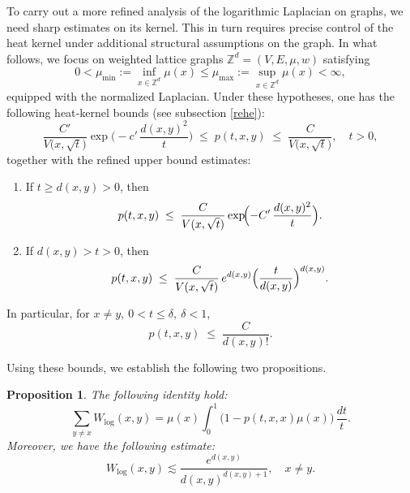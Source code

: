 \documentclass[reqno,12pt]{amsart}
\numberwithin{equation}{section}
\newtheorem{proposition}[theorem]{Proposition}
\begin{document}
To carry out a more refined analysis of the logarithmic Laplacian on graphs, we need sharp estimates on its kernel.  This in turn requires precise control of the heat kernel under additional structural assumptions on the graph.  In what follows, we focus on weighted lattice graphs \(\mathbb{Z}^d=(V,E,\mu,w)\) satisfying
\[
0<\mu_{\min}:=\inf_{x\in\mathbb{Z}^d}\mu(x)\le 
\mu_{\max}:=\sup_{x\in\mathbb{Z}^d}\mu(x)<\infty,
\]
equipped with the normalized Laplacian.  Under these hypotheses, one has the following heat‐kernel bounds (see subsection \ref{rehe}):
\begin{equation}\label{gaussian}
	\frac{C'}{V\bigl(x,\sqrt{t}\bigr)}
	\exp\!\biggl(-c'\,\frac{d(x,y)^2}{t}\biggr)
	\;\le\;
	p(t,x,y)
	\;\le\;
	\frac{C}{V\bigl(x,\sqrt{t}\bigr)},\quad  t>0,
\end{equation}
together with the refined upper bound estimates:
\begin{enumerate}
	\item If \(t \ge d(x,y)>0\), then
	\begin{equation}\label{222}
		p(t,x,y)\;\le\;\frac{C}{V(x,\sqrt{t})}\exp\!\Bigl(-C'\,\frac{d(x,y)^2}{t}\Bigr).
	\end{equation}
	\item If \(d(x,y)>t>0\), then
	\begin{equation}\label{444}
		p(t,x,y)\;\le\;\frac{C}{V(x,\sqrt{t})}\,e^{d(x,y)}\Bigl(\frac{t}{d(x,y)}\Bigr)^{d(x,y)}.
	\end{equation}
\end{enumerate}
In particular, for \(x\ne y,\:0 < t \le \delta,\:\delta<1\),
\begin{equation}\label{333}
	p(t,x,y)\;\le\;\frac{C}{d(x,y)!}.
\end{equation}

Using these bounds, we establish the following two propositions.

\begin{proposition}\label{prop:Wlog11}
	The following identity hold:
	\begin{equation}\label{wlog}
		\sum_{y\ne x}W_{\log}(x,y)
		=\mu(x)\int_0^1\bigl(1-p(t,x,x)\mu(x)\bigr)\,\frac{dt}{t}.
	\end{equation}
	Moreover, we have the following estimate:
	\begin{equation}\label{wlogg}
		W_{\log}(x,y)\lesssim \frac{e^{d(x,y)}}{d(x,y)^{d(x,y)+1}},\quad x\ne y.
	\end{equation}
\end{proposition}
\end{document}
